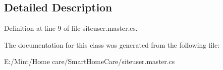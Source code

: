 \subsection{Detailed Description}


Definition at line 9 of file siteuser.\-master.\-cs.



The documentation for this class was generated from the following file\-:\begin{DoxyCompactItemize}
\item 
E\-:/\-Mint/\-Home care/\-Smart\-Home\-Care/siteuser.\-master.\-cs\end{DoxyCompactItemize}
